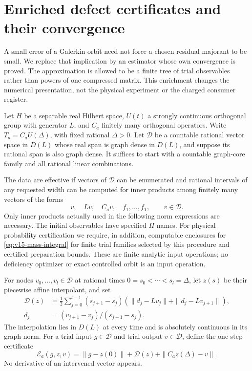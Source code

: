 \section{Enriched defect certificates and their convergence}
\label{sec:v15-enriched}
A small error of a Galerkin orbit need not force a chosen residual
majorant to be small. We replace that implication by an estimator
whose own convergence is proved. The approximation is allowed to be
a finite tree of trial observables rather than powers of one compressed
matrix. This enrichment changes the numerical presentation, not the
physical experiment or the charged consumer register.

Let $H$ be a separable real Hilbert space, $U(t)$ a strongly continuous
orthogonal group with generator $L$, and $C_a$ finitely many orthogonal
operators. Write $T_a=C_aU(\Delta)$, with fixed rational $\Delta>0$.
Let $\mathscr D$ be a countable rational vector space in $D(L)$ whose
real span is graph dense in $D(L)$, and suppose its rational span is
also graph dense. It suffices to start with a countable graph-core
family and all rational linear combinations.

\begin{definition}\label{def:v15-effective}
The data are effective if vectors of $\mathscr D$ can be enumerated
and rational intervals of any requested width can be computed for
inner products among finitely many vectors of the forms
\[
 v,\quad Lv,\quad C_av,\quad f_1,\ldots,f_T,
                 \qquad v\in\mathscr D.
\]
Only inner products actually used in the following norm expressions
are necessary. The initial observables have specified $H$ names.
For physical probability certification we require, in addition,
computable enclosures for \eqref{eq:v15-mass-integral} for finite trial
families selected by this procedure and certified preparation bounds.
These are finite analytic input operations; no deficiency optimizer or
exact controlled orbit is an input operation.
\end{definition}

For nodes $v_0,\ldots,v_l\in\mathscr D$ at rational times
$0=s_0<\cdots<s_l=\Delta$, let $z(s)$ be their piecewise affine
interpolant, and set
\begin{align}\label{eq:v15-enriched-residual}
 \mathcal D(z)&=\frac12\sum_{j=0}^{l-1}(s_{j+1}-s_j)
       \left(\|d_j-Lv_j\|+\|d_j-Lv_{j+1}\|\right),\\
 d_j&=(v_{j+1}-v_j)/(s_{j+1}-s_j).\nonumber
\end{align}
The interpolation lies in $D(L)$ at every time and is absolutely
continuous in its graph norm. For a trial input $g\in\mathscr D$
and trial output $v\in\mathscr D$, define the one-step certificate
\begin{equation}\label{eq:v15-step-certificate}
 \mathcal E_a(g,z,v)=\|g-z(0)\|+\mathcal D(z)
                                    +\|C_az(\Delta)-v\|.
\end{equation}
No derivative of an intervened vector appears.

